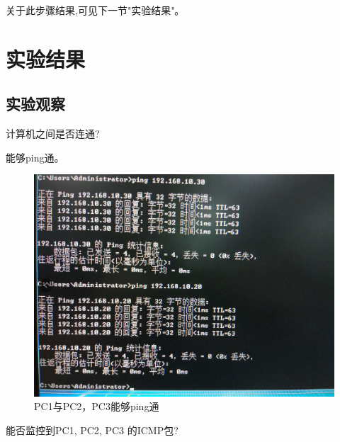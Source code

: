 \documentclass{myreport}
\begin{document}
关于此步骤结果,可见下一节"实验结果"。

\section{实验结果}

\subsection{实验观察}

\begin{tcolorbox}[title = {观察一}]
计算机之间是否连通?
\end{tcolorbox}

能够ping通。

\begin{figure}[htp]
    \centering
    \includegraphics[width=13cm]{"./figure/2018-05-18-02-37-36.png"}
    \caption{PC1与PC2，PC3能够ping通}
    \label{fig:e2-s11-ping}
\end{figure}



\begin{tcolorbox}[title = {观察二}]
能否监控到PC1, PC2, PC3 的ICMP包?
\end{tcolorbox}
\end{document}
